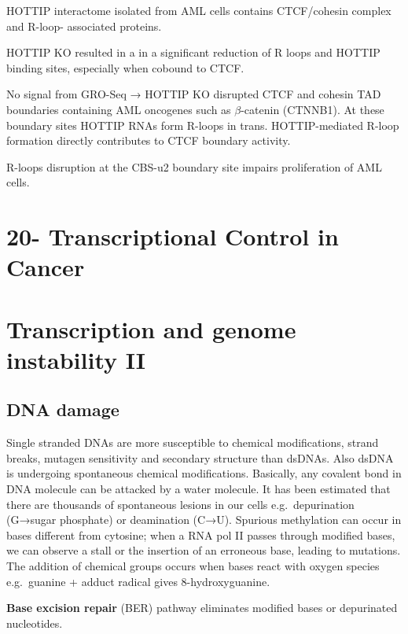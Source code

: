 HOTTIP interactome isolated from AML cells contains CTCF/cohesin complex and R-loop- associated proteins.

HOTTIP KO resulted in a in a significant reduction of R loops and HOTTIP binding sites, especially when cobound to CTCF.

No signal from GRO-Seq → HOTTIP KO disrupted CTCF and cohesin TAD boundaries containing AML oncogenes such as $\beta$-catenin (CTNNB1). At these boundary sites HOTTIP RNAs form R-loops in trans. HOTTIP-mediated R-loop formation directly contributes to CTCF boundary activity.

R-loops disruption at the CBS-u2 boundary site impairs proliferation of AML cells.

\hypertarget{transcriptional-control-in-cancer}{%
\section{20- Transcriptional Control in Cancer}\label{transcriptional-control-in-cancer}}

\hypertarget{transcription-and-genome-instability-ii}{%
\section{Transcription and genome instability II}\label{transcription-and-genome-instability-ii}}

\hypertarget{dna-damage}{%
\subsection{DNA damage}\label{dna-damage}}

Single stranded DNAs are more susceptible to chemical modifications, strand breaks, mutagen sensitivity and secondary structure than dsDNAs. Also dsDNA is undergoing spontaneous chemical modifications. Basically, any covalent bond in DNA molecule can be attacked by a water molecule. It has been estimated that there are thousands of spontaneous lesions in our cells e.g.~depurination (G→sugar phosphate) or deamination (C→U). Spurious methylation can occur in bases different from cytosine; when a RNA pol II passes through modified bases, we can observe a stall or the insertion of an erroneous base, leading to mutations. The addition of chemical groups occurs when bases react with oxygen species e.g.~guanine + adduct radical gives 8-hydroxyguanine.

\textbf{Base excision repair} (BER) pathway eliminates modified bases or depurinated nucleotides.

